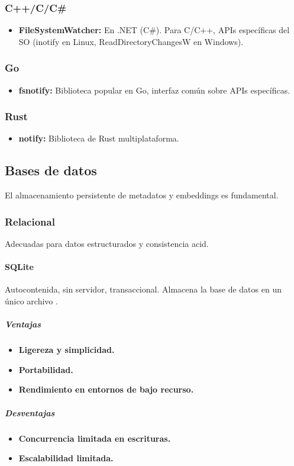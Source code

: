 \subsubsection{C++/C/C\#}
\begin{itemize}
    \item \textbf{FileSystemWatcher:} En .NET (C\#). Para C/C++, APIs específicas del SO (inotify en Linux, ReadDirectoryChangesW en Windows).
\end{itemize}

\subsubsection{Go}
\begin{itemize}
    \item \textbf{fsnotify:} Biblioteca popular en Go, interfaz común sobre APIs específicas.
\end{itemize}

\subsubsection{Rust}
\begin{itemize}
    \item \textbf{notify:} Biblioteca de Rust multiplataforma.
\end{itemize}

\subsection{Bases de datos}
El almacenamiento persistente de metadatos y embeddings es fundamental.

\subsubsection{Relacional}
Adecuadas para datos estructurados y consistencia \gls{acid}.

\paragraph{SQLite}
Autocontenida, sin servidor, transaccional. Almacena la base de datos en un único archivo \cite{noauthor_sqlite_nodate}.
\subparagraph{Ventajas}
\begin{itemize}
    \item \textbf{Ligereza y simplicidad.}
    \item \textbf{Portabilidad.}
    \item \textbf{Rendimiento en entornos de bajo recurso.}
\end{itemize}
\subparagraph{Desventajas}
\begin{itemize}
    \item \textbf{Concurrencia limitada en escrituras.}
    \item \textbf{Escalabilidad limitada.}
\end{itemize}

